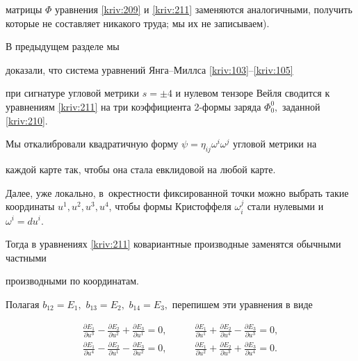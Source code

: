 матрицы $\Phi $ уравнения \eqref{kriv:209} и \eqref{kriv:211} заменяются аналогичными, получить которые не составляет никакого труда; мы их не записываем).





\smallskip




В предыдущем разделе мы 

доказали, что система уравнений Янга--Миллса \eqref{kriv:103}--\eqref{kriv:105} 

при сигнатуре угловой метрики $s=\pm 4$ и нулевом тензоре Вейля сводится к уравнениям \eqref{kriv:211} на три коэффициента 2-формы заряда $\Phi _{0}^{0},$ заданной \eqref{kriv:210}. 

Мы откалибровали квадратичную форму $\psi =\eta _{ij}\omega ^{i}\omega ^{j}$ угловой метрики на 

каждой карте так, чтобы она стала евклидовой на любой карте. 

Далее, уже локально, в~окрестности фиксированной  точки можно  выбрать такие координаты $u^{1},u^{2},u^{3},u^{4}$, чтобы формы Кристоффеля $\omega _{i}^{j}$ стали нулевыми и $\omega ^{i}=du^{i}.$ 

Тогда  в уравнениях \eqref{kriv:211} ковариантные производные заменятся обычными частными 

производными по координатам. 

Полагая $b_{12}=E_{1},$ $b_{13}=E_{2},$ $b_{14}=E_{3},$ перепишем эти уравнения в виде

\begin{equation}

\begin{array}{ll}

\displaystyle

\frac{\partial E_{1}}{\partial u^{3}}-\frac{\partial E_{2}}{\partial u^{2}}+\frac{\partial E_{3}}{\partial u^{1}}=0,\qquad &

\displaystyle

 \frac{\partial E_{1}}{\partial u^{1}}+\frac{\partial E_{2}}{\partial u^{4}}-\frac{\partial E_{3}}{\partial u^{3}}=0, \\[3mm]

 \displaystyle

\frac{\partial E_{1}}{\partial u^{4}}-\frac{\partial E_{2}}{\partial u^{1}}-\frac{\partial E_{3}}{\partial u^{2}}=0, & 

\displaystyle

\frac{\partial E_{1}}{\partial u^{2}}+\frac{\partial E_{2}}{\partial u^{3}}+\frac{\partial E_{3}}{\partial u^{4}}=0.\end{array}

\label{kriv:301}

\end{equation}



